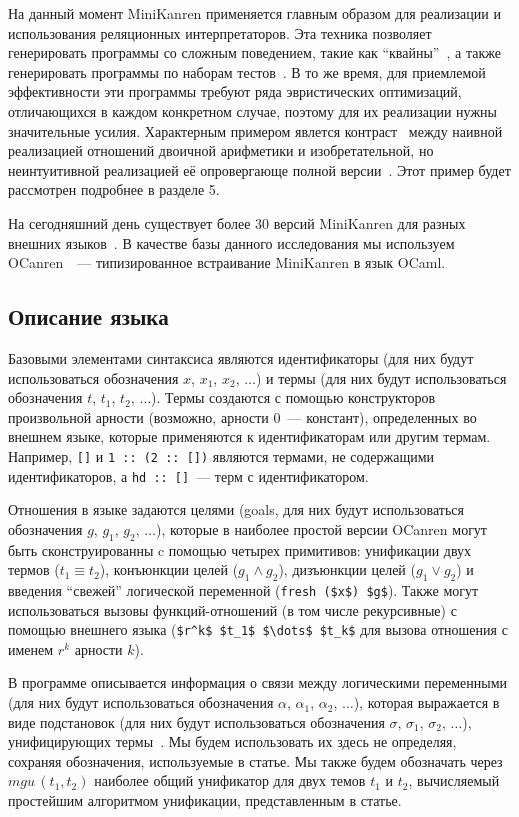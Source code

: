     На данный момент MiniKanren применяется главным образом для реализации и использования реляционных интерпретаторов. Эта техника позволяет генерировать программы со сложным поведением, такие как ``квайны''~\cite{Untagged}, а также генерировать программы по наборам тестов~\cite{unified}. В то же время, для приемлемой эффективности эти программы требуют ряда эвристических оптимизаций, отличающихся в каждом конкретном случае, поэтому для их реализации нужны значительные усилия. Характерным примером явлется контраст~\cite{WillThesis} между наивной реализацией отношений двоичной арифметики и изобретательной, но неинтуитивной реализацией её опровергающе полной версии~\cite{KiselyovArithmetic}. Этот пример будет рассмотрен подробнее в разделе 5.

    На сегодняшний день существует более 30 версий MiniKanren для разных внешних языков~\cite{MiniKanrenOrg}. В качестве базы данного исследования мы используем OCanren~\cite{ocanren}~--- типизированное встраивание MiniKanren в язык OCaml.
    
  \subsection{Описание языка}
    
    Базовыми элементами синтаксиса являются идентификаторы (для них будут использоваться обозначения $x$, $x_1$, $x_2$, $\dots$) и термы (для них будут использоваться обозначения $t$, $t_1$, $t_2$, $\dots$). Термы создаются с помощью конструкторов произвольной арности (возможно, арности 0~--- констант), определенных во внешнем языке, которые применяются к идентификаторам или другим термам. Например, \lstinline|[]| и \lstinline|1 :: (2 :: [])| являются термами, не содержащими идентификаторов, а \lstinline|hd :: []|~--- терм с идентификатором.
    
    Отношения в языке задаются целями (goals, для них будут использоваться обозначения $g$, $g_1$, $g_2$, $\dots$), которые в наиболее простой версии OCanren могут быть сконструированны c помощью четырех примитивов: унификации двух термов (\mbox{$t_1 \equiv t_2$}), конъюнкции целей (\mbox{$g_1 \wedge g_2$}), дизъюнкции целей (\mbox{$g_1 \vee g_2$}) и введения ``свежей'' логической переменной (\lstinline|fresh ($x$) $g$|). Также могут использоваться вызовы функций-отношений (в том числе рекурсивные) с помощью внешнего языка (\lstinline|$r^k$ $t_1$ $\dots$ $t_k$| для вызова отношения с именем $r^k$ арности $k$).
    
    В программе описывается информация о связи между логическими переменными (для них будут использоваться обозначения $\alpha$, $\alpha_1$, $\alpha_2$, $\dots$), которая выражается в виде подстановок (для них будут использоваться обозначения $\sigma$, $\sigma_1$, $\sigma_2$, $\dots$), унифицирующих термы~\cite{Unification}. Мы будем использовать их здесь не определяя, сохраняя обозначения, используемые в статье. Мы также будем обозначать через $mgu\,(t_1, t_2)$ наиболее общий унификатор для двух темов $t_1$ и $t_2$, вычисляемый простейшим алгоритмом унификации, представленным в статье.
    
